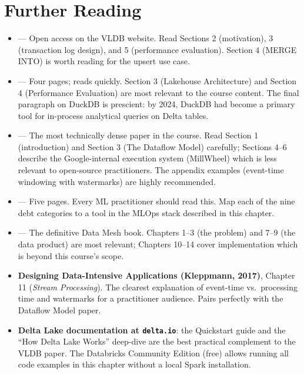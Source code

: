 \section*{Further Reading}
\label{sec:ch11-further}

\begin{itemize}
  \item \textbf{\cite{DeltaLake2020}} --- Open access on the VLDB
        website. Read Sections 2 (motivation), 3 (transaction log design),
        and 5 (performance evaluation). Section 4 (MERGE INTO) is worth
        reading for the upsert use case.
  \item \textbf{\cite{Lakehouse2021}} --- Four pages; reads quickly.
        Section 3 (Lakehouse Architecture) and Section 4 (Performance
        Evaluation) are most relevant to the course content. The final
        paragraph on DuckDB is prescient: by 2024, DuckDB had become
        a primary tool for in-process analytical queries on Delta tables.
  \item \textbf{\cite{Dataflow2015}} --- The most technically dense
        paper in the course. Read Section 1 (introduction) and Section 3
        (The Dataflow Model) carefully; Sections 4--6 describe the
        Google-internal execution system (MillWheel) which is less relevant
        to open-source practitioners. The appendix examples (event-time
        windowing with watermarks) are highly recommended.
  \item \textbf{\cite{MLTechnicalDebt2015}} --- Five pages. Every
        ML practitioner should read this. Map each of the nine debt
        categories to a tool in the MLOps stack described in this chapter.
  \item \textbf{\cite{Dehghani2022}} --- The definitive Data Mesh book.
        Chapters 1--3 (the problem) and 7--9 (the data product) are
        most relevant; Chapters 10--14 cover implementation which is
        beyond this course's scope.
  \item \textbf{Designing Data-Intensive Applications (Kleppmann, 2017)},
        Chapter 11 (\textit{Stream Processing}). The clearest explanation
        of event-time vs.\ processing time and watermarks for a
        practitioner audience. Pairs perfectly with the Dataflow Model paper.
  \item \textbf{Delta Lake documentation at \texttt{delta.io}}: the
        Quickstart guide and the ``How Delta Lake Works'' deep-dive are
        the best practical complement to the VLDB paper. The
        Databricks Community Edition (free) allows running all code
        examples in this chapter without a local Spark installation.
\end{itemize}
